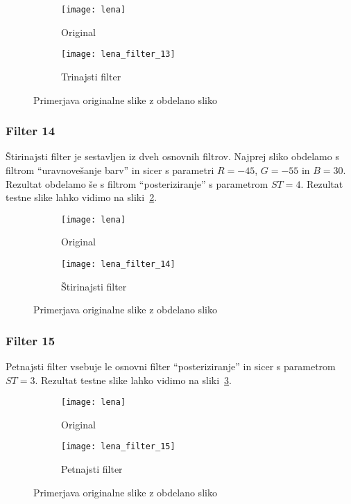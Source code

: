 \begin{figure}[!ht]
    \centering
    \begin{subfigure}[b]{0.4\textwidth}
        \texttt{[image: lena]}
        \caption{Original}
    \end{subfigure}
    \begin{subfigure}[b]{0.4\textwidth}
        \texttt{[image: lena\_filter\_13]}
        \caption{Trinajsti filter}
    \end{subfigure}
    \caption{Primerjava originalne slike z obdelano sliko}
    \label{fig:lena_filter_13}
\end{figure}


\subsubsection*{Filter 14}
Štirinajsti filter je sestavljen iz dveh osnovnih filtrov. Najprej sliko obdelamo s
filtrom ``uravnovešanje barv'' in sicer s parametri $R = -45$, $G = -55$ in
$B = 30$. Rezultat obdelamo še s filtrom ``posteriziranje'' s parametrom
$ST =4$. Rezultat testne slike lahko vidimo na sliki~\ref{fig:lena_filter_14}.

\begin{figure}[!ht]
    \centering
    \begin{subfigure}[b]{0.4\textwidth}
        \texttt{[image: lena]}
        \caption{Original}
    \end{subfigure}
    \begin{subfigure}[b]{0.4\textwidth}
        \texttt{[image: lena\_filter\_14]}
        \caption{Štirinajsti filter}
    \end{subfigure}
    \caption{Primerjava originalne slike z obdelano sliko}
    \label{fig:lena_filter_14}
\end{figure}


\subsubsection*{Filter 15}
Petnajsti filter vsebuje le osnovni filter ``posteriziranje'' in sicer s parametrom
$ST = 3$. Rezultat testne slike lahko vidimo na sliki~\ref{fig:lena_filter_15}.

\begin{figure}[!ht]
    \centering
    \begin{subfigure}[b]{0.4\textwidth}
        \texttt{[image: lena]}
        \caption{Original}
    \end{subfigure}
    \begin{subfigure}[b]{0.4\textwidth}
        \texttt{[image: lena\_filter\_15]}
        \caption{Petnajsti filter}
    \end{subfigure}
    \caption{Primerjava originalne slike z obdelano sliko}
    \label{fig:lena_filter_15}
\end{figure}


